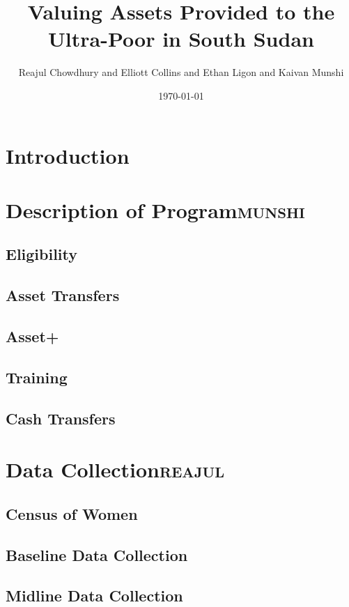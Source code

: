 \documentclass[11pt]{article}
\author{Reajul Chowdhury and Elliott Collins and Ethan Ligon and Kaivan Munshi}
\date{\today}
\title{Valuing Assets Provided to the Ultra-Poor in South Sudan}
\begin{document}
\maketitle
\tableofcontents


\section{Introduction}
\label{sec:orgheadline1}
\section{Description of Program\hfill{}\textsc{munshi}}
\label{sec:orgheadline7}
\subsection{Eligibility}
\label{sec:orgheadline2}
\subsection{Asset Transfers}
\label{sec:orgheadline3}
\subsection{Asset+}
\label{sec:orgheadline4}
\subsection{Training}
\label{sec:orgheadline5}
\subsection{Cash Transfers}
\label{sec:orgheadline6}
\section{Data Collection\hfill{}\textsc{reajul}}
\label{sec:orgheadline13}
\subsection{Census of Women}
\label{sec:orgheadline8}
\subsection{Baseline Data Collection}
\label{sec:orgheadline9}
\subsection{Midline Data Collection}
\label{sec:orgheadline10}
\end{document}
